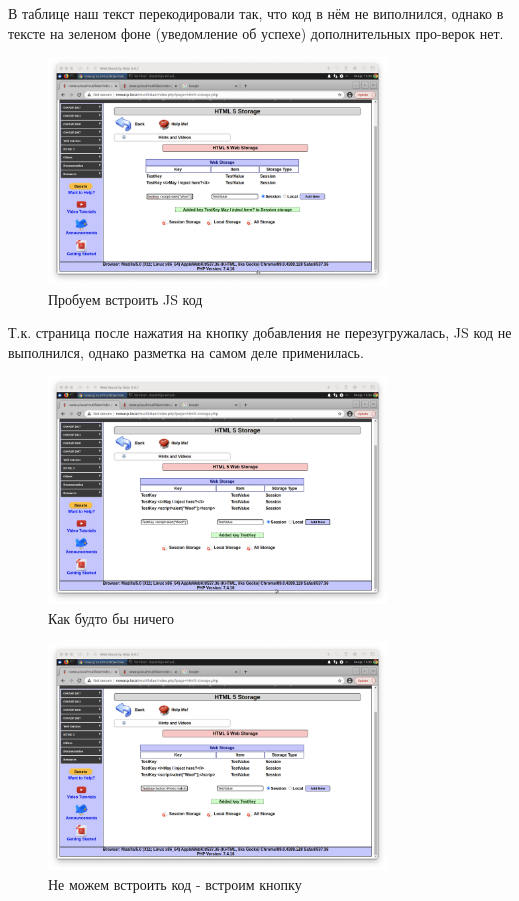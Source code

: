 \documentclass[a4paper]{article}
\begin{document}
  В таблице наш текст перекодировали так, что код в нём не виполнился, однако в
  тексте на зеленом фоне (уведомление об успехе) дополнительных про-верок нет.

  \begin{figure}[H]
    \centering
    \includegraphics[width=0.8\textwidth]{step_00038}
    \caption{Пробуем встроить JS код}
  \end{figure}

  Т.к. страница после нажатия на кнопку добавления не перезугружалась,
  JS код не выполнился, однако разметка на самом деле применилась.

  \begin{figure}[H]
    \centering
    \includegraphics[width=0.8\textwidth]{step_00039}
    \caption{Как будто бы ничего}
  \end{figure}

  \begin{figure}[H]
    \centering
    \includegraphics[width=0.8\textwidth]{step_00040}
    \caption{Не можем встроить код - встроим кнопку}
  \end{figure}
\end{document}
